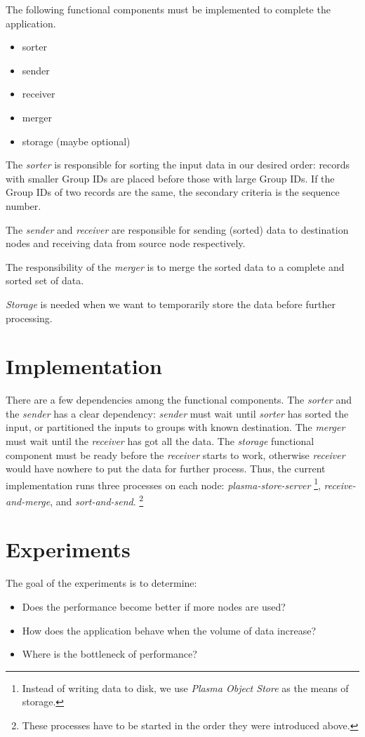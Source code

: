 \documentclass{article}
\begin{document}
The following functional components must be implemented to complete the application.
\begin{itemize}
    \item sorter
    \item sender
    \item receiver
    \item merger
    \item storage (maybe optional)
\end{itemize}

The \textit{sorter} is responsible for sorting the input data in our desired order: records with smaller Group IDs are placed before those with large Group IDs.
If the Group IDs of two records are the same, the secondary criteria is the sequence number.

The \textit{sender} and \textit{receiver} are responsible for sending (sorted) data to destination nodes and receiving data from source node respectively.

The responsibility of the \textit{merger} is to merge the sorted data to a complete and sorted set of data.

\textit{Storage} is needed when we want to temporarily store the data before further processing.

\section{Implementation}
There are a few dependencies among the functional components.
The \textit{sorter} and the \textit{sender} has a clear dependency: \textit{sender} must wait until \textit{sorter} has sorted the input, or partitioned the inputs to groups with known destination.
The \textit{merger} must wait until the \textit{receiver} has got all the data.
The \textit{storage} functional component must be ready before the \textit{receiver} starts to work, otherwise \textit{receiver} would have nowhere to put the data for further process.
Thus, the current implementation runs three processes on each node: \textit{plasma-store-server}
\footnote{Instead of writing data to disk, we use \textit{Plasma Object Store} as the means of storage.}, 
\textit{receive-and-merge}, and \textit{sort-and-send}.
\footnote{These processes have to be started in the order they were introduced above.}

\section{Experiments}
The goal of the experiments is to determine:
\begin{itemize}
    \item Does the performance become better if more nodes are used?
    \item How does the application behave when the volume of data increase?
    \item Where is the bottleneck of performance?
\end{itemize}
\end{document}
